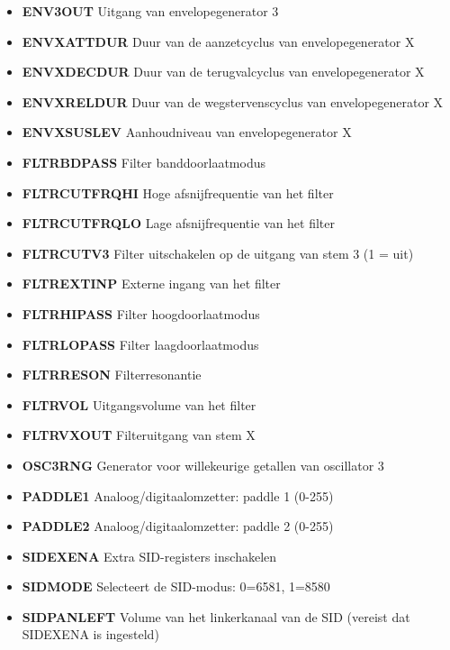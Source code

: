 \begin{itemize}
\item{\bf{ENV3OUT}} Uitgang van envelopegenerator 3
\item{\bf{ENVXATTDUR}} Duur van de aanzetcyclus van envelopegenerator X
\item{\bf{ENVXDECDUR}} Duur van de terugvalcyclus van envelopegenerator X
\item{\bf{ENVXRELDUR}} Duur van de wegstervenscyclus van envelopegenerator X
\item{\bf{ENVXSUSLEV}} Aanhoudniveau van envelopegenerator X
\item{\bf{FLTRBDPASS}} Filter banddoorlaatmodus
\item{\bf{FLTRCUTFRQHI}} Hoge afsnijfrequentie van het filter
\item{\bf{FLTRCUTFRQLO}} Lage afsnijfrequentie van het filter
\item{\bf{FLTRCUTV3}} Filter uitschakelen op de uitgang van stem 3 (1 = uit)
\item{\bf{FLTREXTINP}} Externe ingang van het filter
\item{\bf{FLTRHIPASS}} Filter hoogdoorlaatmodus
\item{\bf{FLTRLOPASS}} Filter laagdoorlaatmodus
\item{\bf{FLTRRESON}} Filterresonantie
\item{\bf{FLTRVOL}} Uitgangsvolume van het filter
\item{\bf{FLTRVXOUT}} Filteruitgang van stem X
\item{\bf{OSC3RNG}} Generator voor willekeurige getallen van oscillator 3
\item{\bf{PADDLE1}} Analoog/digitaalomzetter: paddle 1 (0-255)
\item{\bf{PADDLE2}} Analoog/digitaalomzetter: paddle 2 (0-255)
\item{\bf{SIDEXENA}} Extra SID-registers inschakelen
\item{\bf{SIDMODE}} Selecteert de SID-modus: 0=6581, 1=8580
\item{\bf{SIDPANLEFT}} Volume van het linkerkanaal van de SID (vereist dat SIDEXENA is ingesteld)

\end{itemize}
